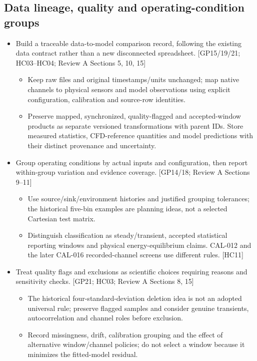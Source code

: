 \subsection{Data lineage, quality and operating-condition groups}
\begin{itemize}[leftmargin=*]
\item Build a traceable data-to-model comparison record, following the existing data contract rather than a new disconnected spreadsheet. [GP15/19/21; HC03--HC04; Review A Sections 5, 10, 15]
\begin{itemize}
\item Keep raw files and original timestamps/units unchanged; map native channels to physical sensors and model observations using explicit configuration, calibration and source-row identities.
\item Preserve mapped, synchronized, quality-flagged and accepted-window products as separate versioned transformations with parent IDs. Store measured statistics, CFD-reference quantities and model predictions with their distinct provenance and uncertainty.
\end{itemize}
\item Group operating conditions by actual inputs and configuration, then report within-group variation and evidence coverage. [GP14/18; Review A Sections 9--11]
\begin{itemize}
\item Use source/sink/environment histories and justified grouping tolerances; the historical five-bin examples are planning ideas, not a selected Cartesian test matrix.
\item Distinguish classification as steady/transient, accepted statistical reporting windows and physical energy-equilibrium claims. CAL-012 and the later CAL-016 recorded-channel screens use different rules. [HC11]
\end{itemize}
\item Treat quality flags and exclusions as scientific choices requiring reasons and sensitivity checks. [GP21; HC03; Review A Sections 8, 15]
\begin{itemize}
\item The historical four-standard-deviation deletion idea is not an adopted universal rule; preserve flagged samples and consider genuine transients, autocorrelation and channel roles before exclusion.
\item Record missingness, drift, calibration grouping and the effect of alternative window/channel policies; do not select a window because it minimizes the fitted-model residual.
\end{itemize}
\end{itemize}

